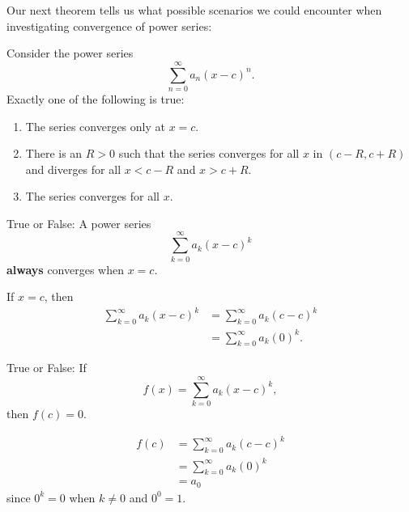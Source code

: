 \documentclass{ximera}
\begin{document}
Our next theorem tells us what possible scenarios we could encounter
when investigating convergence of power series:

\begin{theorem}
  Consider the power series
  \[
  \sum_{n=0}^\infty a_n(x-c)^n.
  \]
  Exactly one of the following is true:
\begin{enumerate}
\item The series converges only at $x=c$.
\item There is an $R>0$ such that the series converges for all $x$ in	
  $(c-R,c+R)$ and diverges for all $x<c-R$ and $x>c+R$.
\item The series converges for all $x$.
\end{enumerate}
\end{theorem}

\begin{question}
  True or False: A power series
  \[
  \sum_{k=0}^\infty a_k(x-c)^k
  \]
  \textbf{always} converges when $x=c$.
  \begin{prompt}
    \begin{multipleChoice}
    \end{multipleChoice}
  \end{prompt}
  \begin{feedback}
    If $x=c$, then
    \begin{align*}
      \sum_{k=0}^\infty a_k(x-c)^k &= \sum_{k=0}^\infty a_k(c-c)^k \\
      &= \sum_{k=0}^\infty a_k(0)^k.
    \end{align*}
  \end{feedback}
  \begin{question}
    True or False: If 
    \[
    f(x) = \sum_{k=0}^\infty a_k(x-c)^k,
    \]
    then $f(c) = 0$. 
  \begin{prompt}
    \begin{multipleChoice}
    \end{multipleChoice}
  \end{prompt}
  \begin{feedback}
    \begin{align*}
      f(c) &= \sum_{k=0}^\infty a_k(c-c)^k \\
      &= \sum_{k=0}^\infty a_k(0)^k\\
      &= a_0
    \end{align*}
    since $0^k = 0$ when $k\ne 0$ and $0^0 = 1$.
  \end{feedback} 
\end{question}
\end{question}
\end{document}
